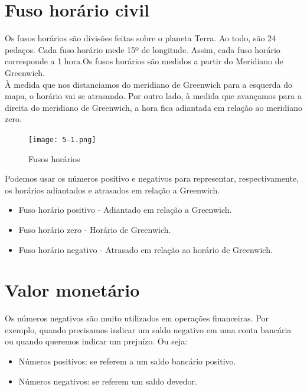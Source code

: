 \documentclass{article}
\begin{document}
\section{Fuso horário civil}
Os fusos horários são divisões feitas sobre o planeta Terra. Ao todo, são 24 pedaços. Cada fuso horário mede 15º de longitude. Assim, cada fuso horário corresponde a 1 hora.Os fusos horários são medidos a partir do Meridiano de Greenwich. 
\\
À medida que nos distanciamos do meridiano de Greenwich para a esquerda do mapa, o horário vai se atrasando. Por outro lado, à medida que avançamos para a direita do meridiano de Greenwich, a hora fica adiantada em relação ao meridiano zero. 
\begin{figure}[htb]
    \centering
    \texttt{[image: 5-1.png]}
    \caption{Fusos horários}
    \label{fig:my_label}
\end{figure}
Podemos usar os números positivo e negativos para representar, respectivamente, os horários adiantados e atrasados em relação a Greenwich. 
\begin{itemize}
    \item Fuso horário positivo - Adiantado em relação a Greenwich.
    \item Fuso horário zero - Horário de Greenwich.
    \item Fuso horário negativo - Atrasado em relação ao horário de Greenwich.
\end{itemize}
\section{Valor monetário}
Os números negativos são muito utilizados em operações financeiras. Por exemplo, quando precisamos indicar um saldo negativo em uma conta bancária ou quando queremos indicar um prejuízo. Ou seja: 
\begin{itemize}
    \item Números positivos: se referem a um saldo bancário positivo. 
    \item Números negativos: se referem um saldo devedor.  
\end{itemize}
\end{document}
